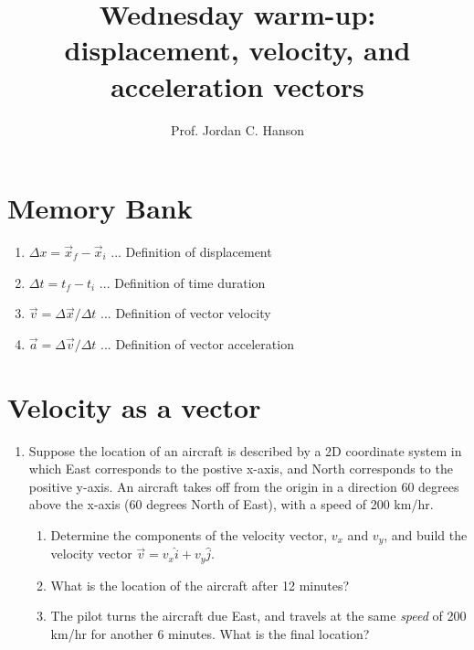 \documentclass{article}
\begin{document}
\twocolumn

\title{Wednesday warm-up: displacement, velocity, and acceleration vectors}
\author{Prof. Jordan C. Hanson}

\maketitle

\section{Memory Bank}

\begin{enumerate}
\item $\Delta x = \vec{x}_f - \vec{x}_i$ ... Definition of displacement
\item $\Delta t = t_f - t_i$ ... Definition of time duration
\item $\vec{v} = \Delta \vec{x} / \Delta t$ ... Definition of vector velocity
\item $\vec{a} = \Delta \vec{v} / \Delta t$ ... Definition of vector acceleration
\end{enumerate}

\section{Velocity as a vector}

\begin{enumerate}
\item Suppose the location of an aircraft is described by a 2D coordinate system in which East corresponds to the postive x-axis, and North corresponds to the positive y-axis.  An aircraft takes off from the origin in a direction 60 degrees above the x-axis (60 degrees North of East), with a speed of 200 km/hr.
\begin{enumerate}
\item Determine the components of the velocity vector, $v_x$ and $v_y$, and build the velocity vector $\vec{v} = v_x \hat{i} + v_y \hat{j}$. \\ \vspace{1.5cm}
\item What is the location of the aircraft after 12 minutes? \\ \vspace{1.5cm}
\item The pilot turns the aircraft due East, and travels at the same \textit{speed} of 200 km/hr for another 6 minutes.  What is the final location? \\ \vspace{1.5cm}
\end{enumerate}
\end{enumerate}
\end{document}
